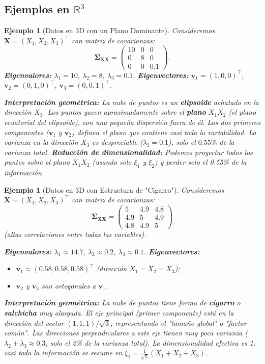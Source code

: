 \documentclass[11pt]{article}
\theoremstyle{plain}
\newtheorem{example}[theorem]{Ejemplo}
\newcommand{\X}{\mathbf{X}}
\newcommand{\bfSigma}{\boldsymbol{\Sigma}}
\newcommand{\R}{\mathbb{R}}
\newcommand{\R}{\mathbb{R}}
\begin{document}
\subsection{Ejemplos en \(\R^3\)}

\begin{example}[Datos en 3D con un Plano Dominante]
\label{ej:plano}
Consideremos \(\X = (X_1, X_2, X_3)^\top\) con matriz de covarianzas:
\[
\bfSigma_{\X\X} = \begin{pmatrix} 10 & 0 & 0 \\ 0 & 8 & 0 \\ 0 & 0 & 0.1 \end{pmatrix}.
\]
\textbf{Eigenvalores:} \(\lambda_1 = 10\), \(\lambda_2 = 8\), \(\lambda_3 = 0.1\). \textbf{Eigenvectores:} \(\mathbf{v}_1 = (1,0,0)^\top\), \(\mathbf{v}_2 = (0,1,0)^\top\), \(\mathbf{v}_3 = (0,0,1)^\top\).

\textbf{Interpretación geométrica:} La nube de puntos es un \textbf{elipsoide} achatado en la dirección \(X_3\). Los puntos yacen aproximadamente sobre el \textbf{plano} \(X_1X_2\) (el plano ecuatorial del elipsoide), con una pequeña dispersión fuera de él. Los dos primeros componentes (\(\mathbf{v}_1\) y \(\mathbf{v}_2\)) definen el plano que contiene casi toda la variabilidad. La varianza en la dirección \(X_3\) es despreciable (\(\lambda_3 = 0.1\)), solo el \(0.55\%\) de la varianza total. \textbf{Reducción de dimensionalidad:} Podemos proyectar todos los puntos sobre el plano \(X_1X_2\) (usando solo \(\xi_1\) y \(\xi_2\)) y perder solo el 0.55\% de la información.
\end{example}

\begin{example}[Datos en 3D con Estructura de "Cigarro"]
\label{ej:cigarro}
Consideremos \(\X = (X_1, X_2, X_3)^\top\) con matriz de covarianzas:
\[
\bfSigma_{\X\X} = \begin{pmatrix} 5 & 4.9 & 4.8 \\ 4.9 & 5 & 4.9 \\ 4.8 & 4.9 & 5 \end{pmatrix}
\]
(altas correlaciones entre todas las variables).

\textbf{Eigenvalores:} \(\lambda_1 \approx 14.7\), \(\lambda_2 \approx 0.2\), \(\lambda_3 \approx 0.1\). \textbf{Eigenvectores:}
\begin{itemize}
    \item \(\mathbf{v}_1 \approx (0.58, 0.58, 0.58)^\top\) (dirección \(X_1 = X_2 = X_3\));
    \item \(\mathbf{v}_2\) y \(\mathbf{v}_3\) son ortogonales a \(\mathbf{v}_1\).
\end{itemize}

\textbf{Interpretación geométrica:} La nube de puntos tiene forma de \textbf{cigarro} o \textbf{salchicha} muy alargada. El eje principal (primer componente) está en la dirección del vector \((1,1,1)/\sqrt{3}\), representando el "tamaño global" o "factor común". Las direcciones perpendiculares a este eje tienen muy poca varianza (\(\lambda_2 + \lambda_3 \approx 0.3\), solo el 2\% de la varianza total). La dimensionalidad efectiva es 1: casi toda la información se resume en \(\xi_1 = \frac{1}{\sqrt{3}}(X_1 + X_2 + X_3)\).
\end{example}
\end{document}
